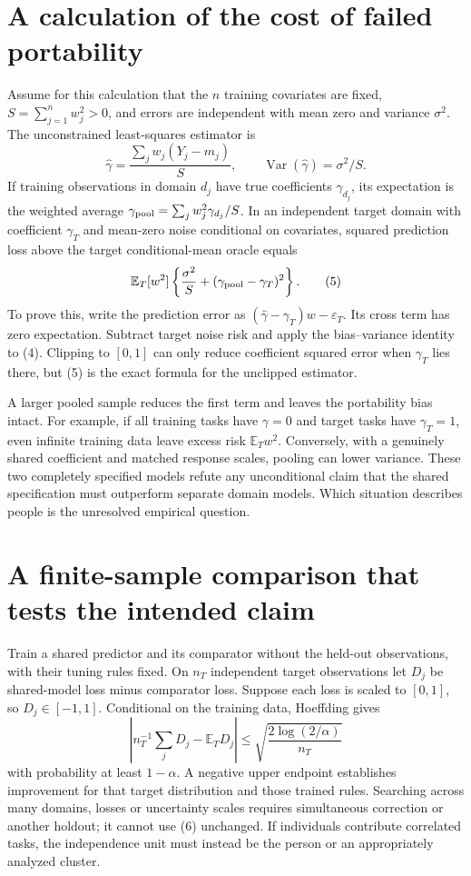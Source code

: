 \documentclass[11pt,a4paper]{article}
\newcommand{\E}{\mathbb E}
\DeclareMathOperator{\Var}{Var}
\begin{document}
\section{A calculation of the cost of failed portability}
Assume for this calculation that the $n$ training covariates are fixed, $S=\sum_{j=1}^n w_j^2>0$, and errors are independent with mean zero and variance $\sigma^2$. The unconstrained least-squares estimator is
\[
 \widehat\gamma=\frac{\sum_jw_j(Y_j-m_j)}S,\qquad
 \Var(\widehat\gamma)=\sigma^2/S.                     \tag{4}
\]
If training observations in domain $d_j$ have true coefficients $\gamma_{d_j}$, its expectation is the weighted average
$\gamma_{\rm pool}=\sum_j w_j^2\gamma_{d_j}/S$.
In an independent target domain with coefficient $\gamma_T$ and mean-zero noise conditional on covariates, squared prediction loss above the target conditional-mean oracle equals
\[
 \E_T[w^2]\left\{\frac{\sigma^2}{S}
                 +(\gamma_{\rm pool}-\gamma_T)^2\right\}.       \tag{5}
\]
To prove this, write the prediction error as $(\widehat\gamma-\gamma_T)w-\varepsilon_T$. Its cross term has zero expectation. Subtract target noise risk and apply the bias--variance identity to (4). Clipping to $[0,1]$ can only reduce coefficient squared error when $\gamma_T$ lies there, but (5) is the exact formula for the unclipped estimator.

A larger pooled sample reduces the first term and leaves the portability bias intact. For example, if all training tasks have $\gamma=0$ and target tasks have $\gamma_T=1$, even infinite training data leave excess risk $\E_Tw^2$. Conversely, with a genuinely shared coefficient and matched response scales, pooling can lower variance. These two completely specified models refute any unconditional claim that the shared specification must outperform separate domain models. Which situation describes people is the unresolved empirical question.

\section{A finite-sample comparison that tests the intended claim}
Train a shared predictor and its comparator without the held-out observations, with their tuning rules fixed. On $n_T$ independent target observations let $D_j$ be shared-model loss minus comparator loss. Suppose each loss is scaled to $[0,1]$, so $D_j\in[-1,1]$. Conditional on the training data, Hoeffding gives
\[
 \left|n_T^{-1}\sum_j D_j-\E_T D_j\right|
 \le\sqrt{\frac{2\log(2/\alpha)}{n_T}}                 \tag{6}
\]
with probability at least $1-\alpha$. A negative upper endpoint establishes improvement for that target distribution and those trained rules. Searching across many domains, losses or uncertainty scales requires simultaneous correction or another holdout; it cannot use (6) unchanged. If individuals contribute correlated tasks, the independence unit must instead be the person or an appropriately analyzed cluster.
\end{document}
